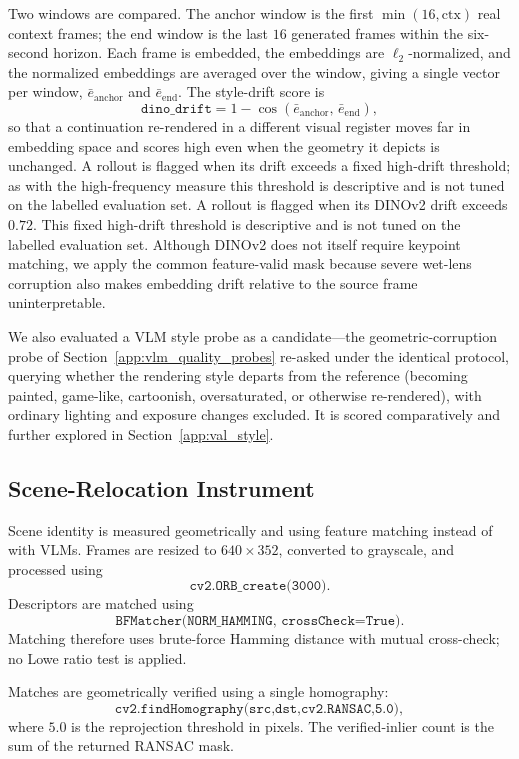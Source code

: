 \documentclass[letterpaper]{article} %
\begin{document}
Two windows are compared. The anchor window is the first $\min(16,\text{ctx})$
real context frames; the end window is the last $16$ generated frames within the
six-second horizon. Each frame is embedded, the embeddings are
$\ell_2$-normalized, and the normalized embeddings are averaged over the window,
giving a single vector per window, $\bar e_{\mathrm{anchor}}$ and
$\bar e_{\mathrm{end}}$. The style-drift score is
\[
\texttt{dino\_drift}
=
1-\cos\!\left(\bar e_{\mathrm{anchor}},\,\bar e_{\mathrm{end}}\right),
\]
so that a continuation re-rendered in a different visual register moves far in
embedding space and scores high even when the geometry it depicts is unchanged.
A rollout is flagged when its drift exceeds a fixed high-drift threshold; as with
the high-frequency measure this threshold is descriptive and is not tuned on the
labelled evaluation set. A rollout is flagged when its DINOv2 drift exceeds $0.72$. This fixed
high-drift threshold is descriptive and is not tuned on the labelled
evaluation set. Although DINOv2 does not itself require keypoint matching, we
apply the common feature-valid mask because severe wet-lens corruption also
makes embedding drift relative to the source frame uninterpretable.

We also evaluated a VLM style probe as a candidate---the geometric-corruption
probe of Section~\ref{app:vlm_quality_probes} re-asked under the identical
protocol, querying whether the rendering style departs from the reference
(becoming painted, game-like, cartoonish, oversaturated, or otherwise
re-rendered), with ordinary lighting and exposure changes excluded. It is scored
comparatively and further explored in Section~\ref{app:val_style}.

\subsection{Scene-Relocation Instrument}
\label{app:scene_relocation}

Scene identity is measured geometrically and using feature matching instead of with VLMs. Frames are
resized to $640\times352$, converted to grayscale, and processed using
\[
\texttt{cv2.ORB\_create(3000)}.
\]
Descriptors are matched using
\[
\texttt{BFMatcher(NORM\_HAMMING, crossCheck=True)}.
\]
Matching therefore uses brute-force Hamming distance with mutual cross-check;
no Lowe ratio test is applied.

Matches are geometrically verified using a single homography:
\[
\texttt{cv2.findHomography(src,dst,cv2.RANSAC,5.0)},
\]
where $5.0$ is the reprojection threshold in pixels. The verified-inlier
count is the sum of the returned RANSAC mask.
\end{document}
